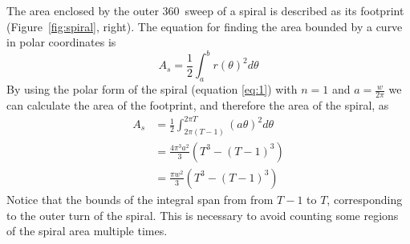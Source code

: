 \documentclass[11pt]{IEEEtran}
\begin{document}
The area enclosed by the outer 360\degree\ sweep of a spiral is described as its footprint (Figure~\ref{fig:spiral}, right). The equation for finding the area bounded by a curve in polar coordinates is 
\begin{equation} \label{eq:4}
	A_{s} = \frac{1}{2} \int_{a}^{b} r(\theta)^2 d\theta
\end{equation}
By using the polar form of the spiral (equation \ref{eq:1}) with \begin{math} n = 1 \end{math} and \begin{math} a = \frac{w}{2 \pi} \end{math} we can calculate the area of the footprint, and therefore the area of the spiral, as
\begin{equation} 
\label{eq:5} 
\begin{split}
	A_{s} &= \frac{1}{2} \int_{2 \pi (T-1)}^{2 \pi T} (a\theta)^2 d\theta \\
		 &= \frac{4 \pi^3 a^2}{3} (T^3 - (T-1)^3) \\
		 &= \frac{\pi w^2}{3} (T^3 - (T-1)^3) 
\end{split} 
\end{equation}
Notice that the bounds of the integral span from from \begin{math} T-1 \end{math} to \begin{math} T \end{math}, corresponding to the outer turn of the spiral. This is necessary to avoid counting some regions of the spiral area multiple times.
\end{document}
